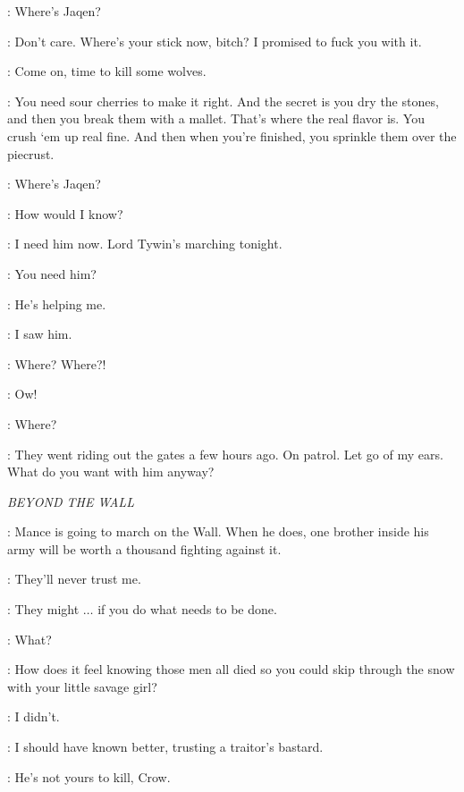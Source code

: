 \ARYA: Where's Jaqen? 

\BITER: Don't care. Where's your stick now, bitch? I promised to fuck you with it. 

\GUARD:  Come on, time to kill some wolves. 


\HOTPIE: You need sour cherries to make it right. And the secret is you dry the stones, and then you break them with a mallet. That's where the real flavor is. You crush `em up real fine. And then when you're finished, you sprinkle them over the piecrust. 

\ARYA: Where's Jaqen? 

\GENDRY: How would I know? 

\ARYA: I need him now. Lord Tywin's marching tonight. 

\GENDRY: You need him? 

\ARYA: He's helping me. 

\HOTPIE: I saw him. 

\ARYA: Where? Where?! 


\HOTPIE: Ow! 

\ARYA: Where? 

\HOTPIE: They went riding out the gates a few hours ago. On patrol. Let go of my ears. What do you want with him anyway? 


\scene

\textit{BEYOND THE WALL} 


\HALFHAND: Mance is going to march on the Wall. When he does, one brother inside his army will be worth a thousand fighting against it. 

\JON: They'll never trust me. 

\HALFHAND: They might $\ldots$ if you do what needs to be done. 

\JON: What? 

\HALFHAND: How does it feel knowing those men all died so you could skip through the snow with your little savage girl? 

\JON: I didn't. 

\HALFHAND: I should have known better, trusting a traitor's bastard. 

\LORDOFBONES: He's not yours to kill, Crow. 


